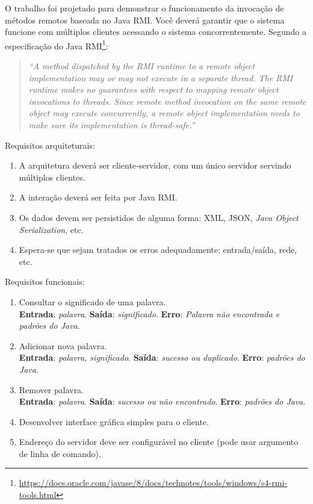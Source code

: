 \documentclass[12pt,brazil, a4paper, fullpage]{article}
\begin{document}
O trabalho foi projetado para demonstrar o funcionamento da invocação de métodos remotos baseada no Java RMI. Você deverá garantir que o sistema funcione com múltiplos clientes acessando o sistema concorrentemente. Segundo a especificação do Java RMI\footnote{\url{https://docs.oracle.com/javase/8/docs/technotes/tools/windows/s4-rmi-tools.html}}:

\begin{quotation}
\textit{``A method dispatched by the RMI runtime to a remote object implementation may or may not execute in a separate thread. The RMI runtime makes no guarantees with respect to mapping remote object invocations to threads. Since remote method invocation on the same remote object may execute concurrently, a remote object implementation needs to make sure its implementation is thread-safe.''
}
\end{quotation}

Requisitos arquiteturais:

\begin{enumerate}
\item A arquitetura deverá ser cliente-servidor, com um único servidor servindo múltiplos clientes.
\item A interação deverá ser feita por Java RMI.
\item Os dados devem ser persistidos de alguma forma: XML, JSON, \textit{Java Object Serialization}, etc.
\item Espera-se que sejam tratados os erros adequadamente: entrada/saída, rede, etc.
\end{enumerate}


Requisitos funcionais:

\begin{enumerate}
\item Consultar o significado de uma palavra. \\
\textbf{Entrada}: \textit{palavra}. \textbf{Saída}: \textit{significado}. \textbf{Erro}: \textit{Palavra não encontrada e padrões do Java}.

\item Adicionar nova palavra. \\
\textbf{Entrada}: \textit{palavra, significado}. \textbf{Saída}: \textit{sucesso ou duplicado}. \textbf{Erro}: \textit{padrões do Java}.

\item Remover palavra. \\
\textbf{Entrada}: \textit{palavra}. \textbf{Saída}: \textit{sucesso ou não encontrado}. \textbf{Erro}: \textit{padrões do Java}.

\item Desenvolver interface gráfica simples para o cliente.

\item Endereço do servidor deve ser configurável no cliente (pode usar argumento de linha de comando).
\end{enumerate}
\end{document}
